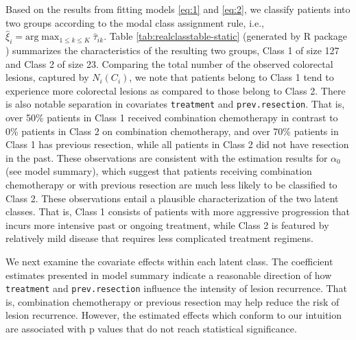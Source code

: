 Based on the results from fitting models \eqref{eq:1} and \eqref{eq:2}, we classify patients into two groups according to the modal class assignment rule, i.e., \(\hat{\xi} _i = \text{arg} \max _{1 \le k \le K} \hat{\tau} _{ik}\). Table \ref{tab:realclasstable-static} (generated by R package  \citep{table1}) summarizes the characteristics of the resulting two groups, Class 1 of size 127 and Class 2 of size 23. Comparing the total number of the observed colorectal lesions, captured by \(N_i(C_i)\), we note that patients belong to Class 1 tend to experience more colorectal lesions as compared to those belong to Class 2. There is also notable separation in covariates \texttt{treatment} and \texttt{prev.resection}. That is, over 50\% patients in Class 1 received combination chemotherapy in contrast to 0\% patients in Class 2 on combination chemotherapy, and over 70\% patients in Class 1 has previous resection, while all patients in Class 2 did not have resection in the past. These observations are consistent with the estimation results for \(\alpha_0\) (see model summary), which suggest that patients receiving combination chemotherapy or with previous resection are much less likely to be classified to Class 2. These observations entail a plausible characterization of the two latent classes. That is, Class 1 consists of patients with more aggressive progression that incurs more intensive past or ongoing treatment, while Class 2 is featured by relatively mild disease that requires less complicated treatment regimens.

We next examine the covariate effects within each latent class. The coefficient estimates presented in model summary indicate a reasonable direction of how \texttt{treatment} and \texttt{prev.resection} influence the intensity of lesion recurrence. That is, combination chemotherapy or previous resection may help reduce the risk of lesion recurrence. However, the estimated effects which conform to our intuition are associated with p values that do not reach statistical significance.


